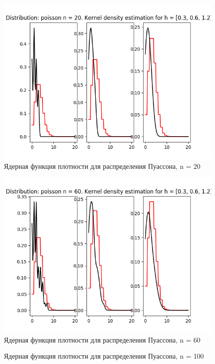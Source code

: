\documentclass[12pt]{report}
\begin{document}
\begin{center}
    \begin{figure}[H]
 \caption{Ядерная функция плотности для распределения Пуассона, n = 20}
\includegraphics[width=\textwidth]{../lab_4/pic/kernel/d_poisson20.png}
\end{figure}
    \begin{figure}[H]
 \caption{Ядерная функция плотности для распределения Пуассона, n = 60}
\includegraphics[width=\textwidth]{../lab_4/pic/kernel/d_poisson60.png}
\end{figure}
    \begin{figure}[H]
 \caption{Ядерная функция плотности для распределения Пуассона, n = 100}

\end{figure}
\end{center}
\end{document}
